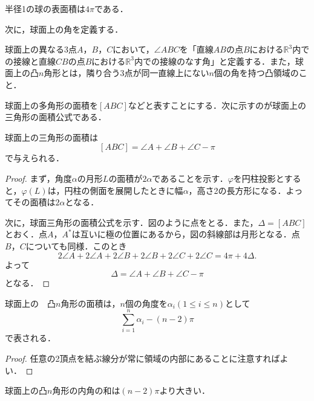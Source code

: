 \documentclass[uplatex]{jsarticle}
\begin{document}
\begin{corollary}
半径1の球の表面積は$4\pi$である．
\end{corollary}

次に，球面上の角を定義する．

\begin{definition}
球面上の異なる3点$A，B，C$において，$\angle ABC$を「直線$AB$の点$B$における$\mathbb{R}^3$内での接線と直線$CB$の点$B$における$\mathbb{R}^3$内での接線のなす角」と定義する．また，球面上の凸$n$角形とは，隣り合う3点が同一直線上にない$n$個の角を持つ凸領域のこと．
\end{definition}

球面上の多角形の面積を$[ABC]$などと表すことにする．次に示すのが球面上の三角形の面積公式である．

\begin{theorem}[ジラールの公式]球面上の三角形の面積は
\[ [ABC]=\angle A+\angle B+\angle C-\pi \]
で与えられる．
\end{theorem}
\begin{center}

\end{center}
\begin{proof}
まず，角度$\alpha$の月形$L$の面積が$2\alpha$であることを示す．$\varphi$を円柱投影とすると，$\varphi(L)$は，円柱の側面を展開したときに幅$\alpha$，高さ2の長方形になる．よってその面積は$2\alpha$となる．

次に，球面三角形の面積公式を示す．図のように点をとる．また，$\Delta=[ABC]$とおく．点$A$，$A^*$は互いに極の位置にあるから，図の斜線部は月形となる．点$B，C$についても同様．このとき
\[ 2\angle A+2\angle A+2\angle B+2\angle B+2\angle C+2\angle C=4\pi+4\Delta. \]
よって
\[ \Delta=\angle A+\angle B+\angle C-\pi \]
となる．
\end{proof}

\begin{corollary}球面上の　凸$n$角形の面積は，$n$個の角度を$\alpha_i(1\le i\le n)$として
\[ \sum_{i=1}^n \alpha_i -(n-2)\pi \]
で表される．\end{corollary}
\begin{proof}任意の2頂点を結ぶ線分が常に領域の内部にあることに注意すればよい．\end{proof}

\begin{corollary}球面上の凸$n$角形の内角の和は$(n-2)\pi$より大きい．\end{corollary}
\end{document}
